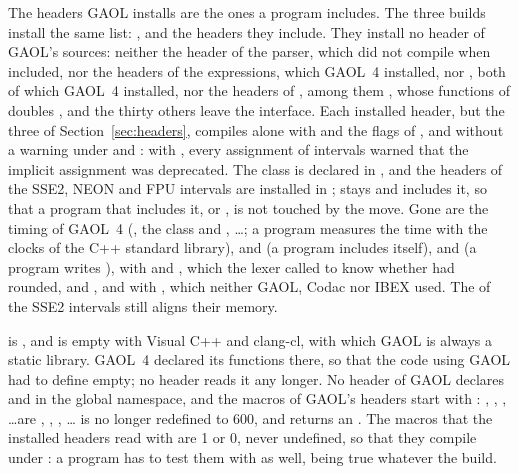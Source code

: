 \medskip
The headers GAOL installs are the ones a program includes.\newinvfive{} The
three builds install the same list: ,  and
the headers they include. They install no header of GAOL's sources: neither
the header of the parser, which did not compile when included, nor the headers
of the expressions, which GAOL~4 installed, nor
, both of which GAOL~4 installed, nor the
headers of , among them , whose
functions of doubles ,  and the thirty others
leave the interface. Each installed header, but the three of Section~\ref{sec:headers}, compiles
alone with
 and the flags of , and without a warning
under  and : with
, every assignment of intervals warned that the implicit
assignment was deprecated. The class  is declared in
, and the headers of the SSE2, NEON
and FPU intervals are installed in ;
 stays and includes it, so that a program that
includes it, or , is not touched by the move. Gone are the
timing of GAOL~4 (, the class 
and , \ldots; a program measures the
time with the clocks of the C++ standard library),
 and  (a program
includes  itself),  and
 (a program writes ),
 with  and
, which the lexer called to know whether
 had rounded,  and
, and  with
, which neither GAOL, Codac nor IBEX used.
The  of the SSE2 intervals still aligns their memory.

\medskip
{} is , and is empty with Visual
C++ and clang-cl, with which GAOL is always a static library.\newinvfive{}
GAOL~4 declared its functions  there, so that
the code using GAOL had to define  empty; no
header reads it any longer. No header of GAOL declares  and
 in the global namespace, and the macros of GAOL's headers
start with : , , ,
\ldots are ,
, , \ldots
{} is no longer redefined to 600, and
 returns an . The macros
that the installed headers read with  are 1 or 0, never undefined,
so that they compile under : a program has to test
them with  as well,  being
true whatever the build.

